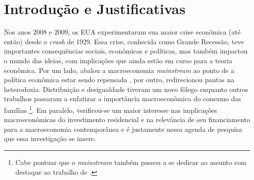 \section{Introdução e Justificativas}\label{Intro}




Nos anos 2008 e 2009,
os EUA experimentaram sua maior crise econômica (até então) desde o \textit{crash} de 1929. Essa crise, conhecida como Grande Recessão, teve importantes consequências sociais, econômicas e políticas, mas também impactou o mundo das ideias, com implicações que ainda estão em curso para a teoria econômica. 
Por um lado, abalou a macroeconomia \textit{mainstream} ao ponto de a política econômica estar sendo repensada \cite{blanchard_rethinking_2010}, por outro, redirecionou pautas na heterodoxia. 
Distribuição e desigualdade tiveram um novo fôlego \cites{carvalho_personal_2016}{ederer_will_2019} 
enquanto outros trabalhos passaram a enfatizar a importância macroeconômica do consumo das famílias \cites{barba_rising_2009}{brochier_macroeconomics_2017}\footnote{Cabe pontuar que o \textit{mainstream}  também passou a se dedicar ao assunto com destaque ao trabalho de \textcite{piketty_o_2014}.}.
Em paralelo, verificou-se um maior interesse nas implicações macroeconômicas do investimento residencial \cites{teixeira_crescimento_2015}{fiebiger_semi-autonomous_2018} e na relevância de seu financiamento para a macroeconomia contemporânea \cite{jorda_great_2016} e é justamente nessa agenda de pesquisa que essa investigação se insere.

